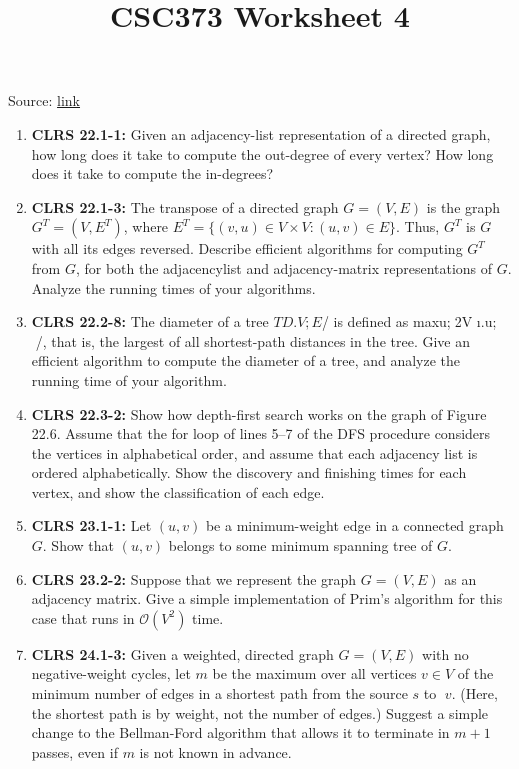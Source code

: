 \documentclass[12pt]{article}
\begin{document}
\title{CSC373 Worksheet 4}
\maketitle

\bigskip

Source: \href{http://www.cs.toronto.edu/~denisp/csc373/material.html}{link}

\bigskip

\begin{enumerate}[1.]
    \item \textbf{CLRS 22.1-1:} Given an adjacency-list representation of a directed graph, how long does it take
    to compute the out-degree of every vertex? How long does it take to compute the in-degrees?

    \item \textbf{CLRS 22.1-3:} The transpose of a directed graph $G = (V,E)$ is the graph $G^T = (V,E^T)$, where
    $E^T = \{(v,u) \in V \times V : (u,v) \in E\}$. Thus, $G^T$ is $G$ with all its edges reversed.
    Describe efficient algorithms for computing $G^T$ from $G$, for both the adjacencylist
    and adjacency-matrix representations of $G$. Analyze the running times of your
    algorithms.

    \item \textbf{CLRS 22.2-8:} The diameter of a tree $T D .V;E$/ is defined as maxu;2V ı.u; /, that is, the
    largest of all shortest-path distances in the tree. Give an efficient algorithm to
    compute the diameter of a tree, and analyze the running time of your algorithm.

    \item \textbf{CLRS 22.3-2:} Show how depth-first search works on the graph of Figure 22.6. Assume that the
    for loop of lines 5–7 of the DFS procedure considers the vertices in alphabetical
    order, and assume that each adjacency list is ordered alphabetically. Show the
    discovery and finishing times for each vertex, and show the classification of each
    edge.

    \item \textbf{CLRS 23.1-1:} Let $(u,v)$ be a minimum-weight edge in a connected graph $G$. Show that $(u,v)$
    belongs to some minimum spanning tree of $G$.

    \item \textbf{CLRS 23.2-2:} Suppose that we represent the graph $G = (V,E)$ as an adjacency matrix. Give a
    simple implementation of Prim’s algorithm for this case that runs in $\mathcal{O}(V^2)$ time.

    \item \textbf{CLRS 24.1-3:}
    Given a weighted, directed graph $G = (V,E)$ with no negative-weight cycles,
    let $m$ be the maximum over all vertices $v \in V$ of the minimum number of edges
    in a shortest path from the source $s$ to $v$. (Here, the shortest path is by weight, not
    the number of edges.) Suggest a simple change to the Bellman-Ford algorithm that
    allows it to terminate in $m + 1$ passes, even if $m$ is not known in advance.

\end{enumerate}
\end{document}

